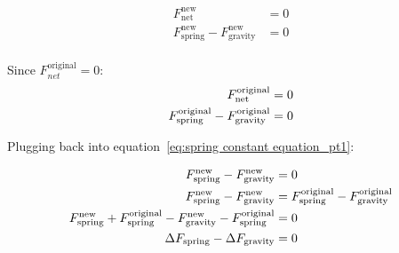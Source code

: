 \documentclass{article}
\begin{document}
            \begin{equation}
                \begin{aligned}
                    F_{\text{net}}^{\text{new}} &= 0 \\
                    F_{\text{spring}}^{\text{new}} - F_{\text{gravity}}^{\text{new}} &= 0 \\
                \end{aligned}\label{eq:spring constant equation_pt1}
            \end{equation}
            
            Since $F_{net}^{\text{original}} = 0$:
            \begin{equation}
                \begin{aligned}
                    \notag
                    F_{\text{net}}^{\text{original}} &= 0 \\
                    F_{\text{spring}}^{\text{original}} - F_{\text{gravity}}^{\text{original}} &= 0 \\
                \end{aligned}\label{eq:spring constant equation_pt2}
            \end{equation}
            
            Plugging back into equation~\ref{eq:spring constant equation_pt1}:
            
            \begin{equation}
                \begin{aligned}
                    \notag
                    F_{\text{spring}}^{\text{new}} - F_{\text{gravity}}^{\text{new}} &= 0 \\
                    F_{\text{spring}}^{\text{new}} - F_{\text{gravity}}^{\text{new}} &= F_{\text{spring}}^{\text{original}} - F_{\text{gravity}}^{\text{original}} \\
                    F_{\text{spring}}^{\text{new}} + F_{\text{spring}}^{\text{original}}- F_{\text{gravity}}^{\text{new}} - F_{\text{spring}}^{\text{original}} &= 0 \\
                    \Delta F_{\text{spring}} - \Delta F_{\text{gravity}} &= 0 \\
                \end{aligned}\label{eq:spring constant equation_pt3}
            \end{equation}
            
\end{document}
